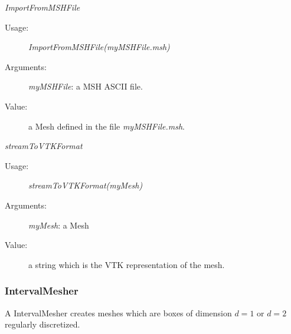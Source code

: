 \begin{description}
\begin{description}
\item \textit{ImportFromMSHFile}
\begin{description}
\item[Usage:] \textit{ImportFromMSHFile(myMSHFile.msh)}
\item[Arguments:] \textit{myMSHFile}: a MSH ASCII file.
\item[Value:] a Mesh defined in the file \textit{myMSHFile.msh}.
\end{description}
\bigskip

\item \textit{streamToVTKFormat}
\begin{description}
\item[Usage:] \textit{streamToVTKFormat(myMesh)}
\item[Arguments:] \textit{myMesh}: a Mesh
\item[Value:] a string which is the VTK representation of the mesh.
\end{description}

\end{description}

\end{description}




\newpage
{}
\subsubsection{IntervalMesher}

A IntervalMesher creates meshes which are boxes of dimension $d=1$ or $d=2$ regularly discretized.

